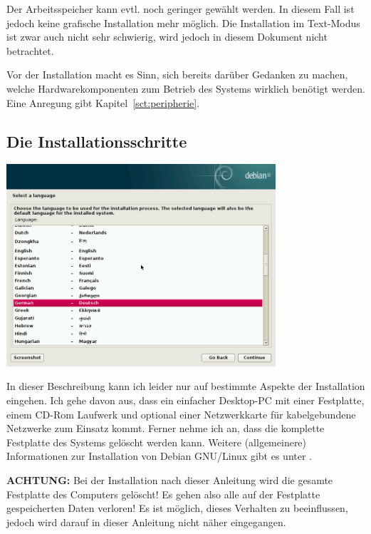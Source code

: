 \documentclass[a4paper,12pt,twoside]{article}
\begin{document}
Der Arbeitsspeicher kann evtl. noch geringer gewählt werden. In diesem
Fall ist jedoch keine grafische Installation mehr möglich. Die
Installation im Text-Modus ist zwar auch nicht sehr schwierig, wird
jedoch in diesem Dokument nicht betrachtet.

Vor der Installation macht es Sinn, sich bereits darüber Gedanken zu
machen, welche Hardwarekomponenten zum Betrieb des Systems wirklich
benötigt werden. Eine Anregung gibt Kapitel~\ref{sct:peripherie}.


\subsection{Die Installationsschritte}
\label{sct:inst_schritte}

\begin{minipage}{\linewidth}
    \centering
    \includegraphics[width=10cm]{screenshots/select_language.png}
    \label{fig:inst_sprache}
\end{minipage}

\bigskip
In dieser Beschreibung kann ich leider nur auf bestimmte Aspekte der
Installation eingehen. Ich gehe davon aus, dass ein einfacher
Desktop-PC mit einer Festplatte, einem CD-Rom Laufwerk und optional
einer Netzwerkkarte für kabelgebundene Netzwerke zum Einsatz kommt.
Ferner nehme ich an, dass die komplette Festplatte des Systems gelöscht
werden kann. Weitere (allgemeinere) Informationen zur Installation von
Debian GNU/Linux gibt es unter \cite{DEB2}.

\textbf{ACHTUNG:} Bei der Installation nach dieser Anleitung wird die gesamte
Festplatte des Computers gelöscht! Es gehen also alle auf der
Festplatte gespeicherten Daten verloren! Es ist möglich, dieses
Verhalten zu beeinflussen, jedoch wird darauf in dieser Anleitung nicht
näher eingegangen.
\end{document}
